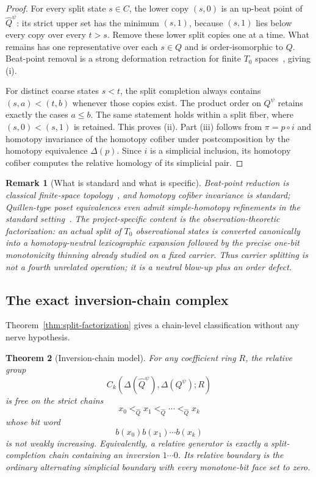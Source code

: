 \documentclass[11pt]{article}
\newtheorem{theorem}{Theorem}[section]
\newtheorem{remark}[theorem]{Remark}
\begin{document}
\begin{proof}
For every split state $s\in C$, the lower copy $(s,0)$ is an up-beat point of
$\widehat Q^\psi$: its strict upper set has the minimum $(s,1)$, because
$(s,1)$ lies below every copy over every $t>s$.  Remove these lower split
copies one at a time.  What remains has one representative over each $s\in Q$
and is order-isomorphic to $Q$.  Beat-point removal is a strong deformation
retraction for finite $T_0$ spaces~\cite{Stong1966}, giving (i).

For distinct coarse states $s<t$, the split completion always contains
$(s,a)<(t,b)$ whenever those copies exist.  The product order on $Q^\psi$
retains exactly the cases $a\leq b$.  The same statement holds within a split
fiber, where $(s,0)<(s,1)$ is retained.  This proves (ii).  Part (iii) follows
from $\pi=p\circ i$ and homotopy invariance of the homotopy cofiber under
postcomposition by the homotopy equivalence $\Delta(p)$.  Since $i$ is a
simplicial inclusion, its homotopy cofiber computes the relative homology of
its simplicial pair.
\end{proof}

\begin{remark}[What is standard and what is specific]
Beat-point reduction is classical finite-space topology~\cite{Stong1966}, and homotopy cofiber
invariance is standard; Quillen-type poset equivalences even admit simple-homotopy refinements in the standard setting~\cite{Barmak2011}.  The project-specific content is the observation-theoretic
factorization: an actual split of $T_0$ observational states is converted canonically
into a homotopy-neutral lexicographic expansion followed by the precise one-bit
monotonicity thinning already studied on a fixed carrier.  Thus carrier splitting
is not a fourth unrelated operation; it is a neutral blow-up plus an order defect.
\end{remark}

\subsection{The exact inversion-chain complex}

Theorem~\ref{thm:split-factorization} gives a chain-level classification without
any nerve hypothesis.

\begin{theorem}[Inversion-chain model]\label{thm:inversion-chain}
For any coefficient ring $R$, the relative group
\[
 C_k\!\left(\Delta(\widehat Q^\psi),\Delta(Q^\psi);R\right)
\]
is free on the strict chains
\[
 x_0<_{\widehat Q}x_1<_{\widehat Q}\cdots<_{\widehat Q}x_k
\]
whose bit word
\[
 b(x_0)b(x_1)\cdots b(x_k)
\]
is not weakly increasing.  Equivalently, a relative generator is exactly a
split-completion chain containing an inversion $1\cdots0$.  Its relative boundary
is the ordinary alternating simplicial boundary with every monotone-bit face set
to zero.
\end{theorem}
\end{document}
